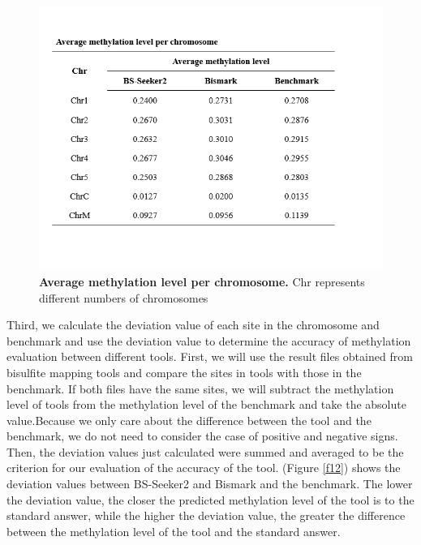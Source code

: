 \documentclass{PHlab-thesis}
\begin{document}
\begin{figure}[h]
  \centering
  \includegraphics[scale=1.0]{table/table4.png}
  \caption{\textbf{Average methylation level per chromosome.}
  Chr represents different numbers of chromosomes}
  \label{f11}
\end{figure}

\par
Third, we calculate the deviation value of each site in the chromosome and benchmark and use the deviation value to determine the accuracy of methylation evaluation between different tools. First, we will use the result files obtained from bisulfite mapping tools and compare the sites in tools with those in the benchmark. If both files have the same sites, we will subtract the methylation level of tools from the methylation level of the benchmark and take the absolute value.Because we only care about the difference between the tool and the benchmark, we do not need to consider the case of positive and negative signs. Then, the deviation values just calculated were summed and averaged to be the criterion for our evaluation of the accuracy of the tool. (Figure \ref{f12}) shows the deviation values between BS-Seeker2 and Bismark and the benchmark. The lower the deviation value, the closer the predicted methylation level of the tool is to the standard answer, while the higher the deviation value, the greater the difference between the methylation level of the tool and the standard answer.
\end{document}
